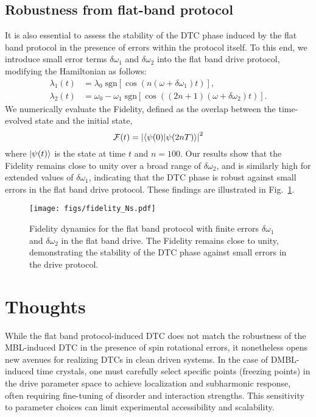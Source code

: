 \documentclass[a4paper,10pt]{article}
\begin{document}
\subsection{Robustness from flat-band protocol}
It is also essential to assess the stability of the DTC phase induced by the flat band protocol in the presence of errors within the protocol itself. To this end, we introduce small error terms $\delta\omega_1$ and $\delta\omega_2$ into the flat band drive protocol, modifying the Hamiltonian as follows:
\begin{align}
    \lambda_1(t) &= \lambda_0 \;\mathrm{sgn}\left[\cos\left(n(\omega + \delta\omega_1) t\right)\right],\\
    \lambda_2(t) &= \omega_0 - \omega_1 \;\mathrm{sgn}\left[\cos\left((2n+1)(\omega + \delta\omega_2) t\right)\right].
\end{align}
We numerically evaluate the Fidelity, defined as the overlap between the time-evolved state and the initial state,
\begin{equation}
    \mathcal{F}(t) = \abs{\braket{\psi(0)}{\psi(2nT)}}^2
\end{equation}
where $\ket{\psi(t)}$ is the state at time $t$ and $n = 100$. Our results show that the Fidelity remains close to unity over a broad range of $\delta\omega_2$, and is similarly high for extended values of $\delta\omega_1$, indicating that the DTC phase is robust against small errors in the flat band drive protocol. These findings are illustrated in Fig.~\ref{fig:fidelity}.
\begin{figure}[h]
    \centering
    \texttt{[image: figs/fidelity\_Ns.pdf]}
    \caption{Fidelity dynamics for the flat band protocol with finite errors $\delta\omega_1$ and $\delta\omega_2$ in the flat band drive. The Fidelity remains close to unity, demonstrating the stability of the DTC phase against small errors in the drive protocol.}
    \label{fig:fidelity}
\end{figure}

\section{Thoughts}
While the flat band protocol-induced DTC does not match the robustness of the MBL-induced DTC in the presence of spin rotational errors, it nonetheless opens new avenues for realizing DTCs in clean driven systems. In the case of DMBL-induced time crystals, one must carefully select specific points (freezing points) in the drive parameter space to achieve localization and subharmonic response, often requiring fine-tuning of disorder and interaction strengths. This sensitivity to parameter choices can limit experimental accessibility and scalability.
\end{document}
